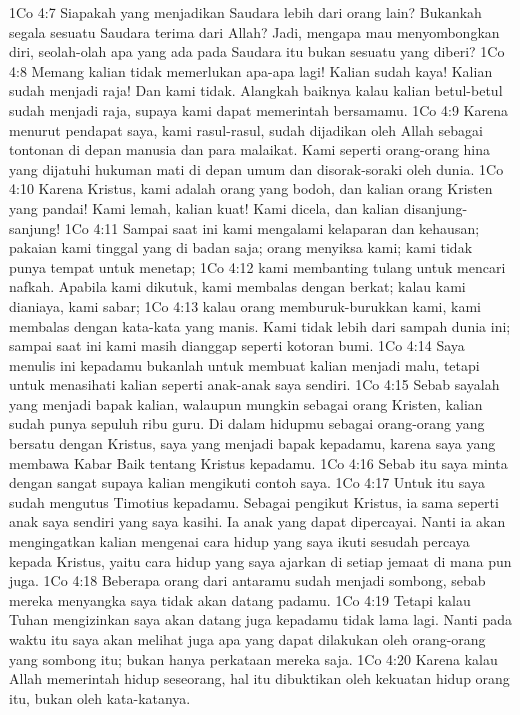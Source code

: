1Co 4:7  Siapakah yang menjadikan Saudara lebih dari orang lain? Bukankah segala sesuatu Saudara terima dari Allah? Jadi, mengapa mau menyombongkan diri, seolah-olah apa yang ada pada Saudara itu bukan sesuatu yang diberi?
1Co 4:8  Memang kalian tidak memerlukan apa-apa lagi! Kalian sudah kaya! Kalian sudah menjadi raja! Dan kami tidak. Alangkah baiknya kalau kalian betul-betul sudah menjadi raja, supaya kami dapat memerintah bersamamu.
1Co 4:9  Karena menurut pendapat saya, kami rasul-rasul, sudah dijadikan oleh Allah sebagai tontonan di depan manusia dan para malaikat. Kami seperti orang-orang hina yang dijatuhi hukuman mati di depan umum dan disorak-soraki oleh dunia.
1Co 4:10  Karena Kristus, kami adalah orang yang bodoh, dan kalian orang Kristen yang pandai! Kami lemah, kalian kuat! Kami dicela, dan kalian disanjung-sanjung!
1Co 4:11  Sampai saat ini kami mengalami kelaparan dan kehausan; pakaian kami tinggal yang di badan saja; orang menyiksa kami; kami tidak punya tempat untuk menetap;
1Co 4:12  kami membanting tulang untuk mencari nafkah. Apabila kami dikutuk, kami membalas dengan berkat; kalau kami dianiaya, kami sabar;
1Co 4:13  kalau orang memburuk-burukkan kami, kami membalas dengan kata-kata yang manis. Kami tidak lebih dari sampah dunia ini; sampai saat ini kami masih dianggap seperti kotoran bumi.
1Co 4:14  Saya menulis ini kepadamu bukanlah untuk membuat kalian menjadi malu, tetapi untuk menasihati kalian seperti anak-anak saya sendiri.
1Co 4:15  Sebab sayalah yang menjadi bapak kalian, walaupun mungkin sebagai orang Kristen, kalian sudah punya sepuluh ribu guru. Di dalam hidupmu sebagai orang-orang yang bersatu dengan Kristus, saya yang menjadi bapak kepadamu, karena saya yang membawa Kabar Baik tentang Kristus kepadamu.
1Co 4:16  Sebab itu saya minta dengan sangat supaya kalian mengikuti contoh saya.
1Co 4:17  Untuk itu saya sudah mengutus Timotius kepadamu. Sebagai pengikut Kristus, ia sama seperti anak saya sendiri yang saya kasihi. Ia anak yang dapat dipercayai. Nanti ia akan mengingatkan kalian mengenai cara hidup yang saya ikuti sesudah percaya kepada Kristus, yaitu cara hidup yang saya ajarkan di setiap jemaat di mana pun juga.
1Co 4:18  Beberapa orang dari antaramu sudah menjadi sombong, sebab mereka menyangka saya tidak akan datang padamu.
1Co 4:19  Tetapi kalau Tuhan mengizinkan saya akan datang juga kepadamu tidak lama lagi. Nanti pada waktu itu saya akan melihat juga apa yang dapat dilakukan oleh orang-orang yang sombong itu; bukan hanya perkataan mereka saja.
1Co 4:20  Karena kalau Allah memerintah hidup seseorang, hal itu dibuktikan oleh kekuatan hidup orang itu, bukan oleh kata-katanya.
